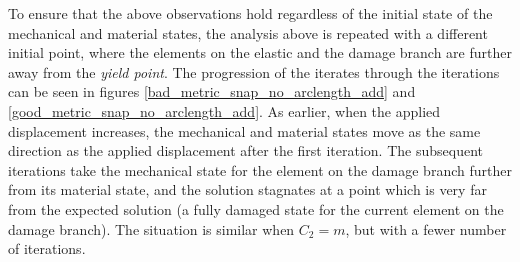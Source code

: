 \documentclass[10pt]{elsarticle}
\begin{document}
To ensure that the above observations hold regardless of the initial state of the mechanical and material states, the analysis above is repeated with a different initial point, where the elements on the elastic and the damage branch are further away from the \textit{yield point}. The progression of the iterates through the iterations can be seen in figures \ref{bad_metric_snap_no_arclength_add} and \ref{good_metric_snap_no_arclength_add}. As earlier, when the applied displacement increases, the mechanical and material states move as the same direction as the applied displacement after the first iteration. The subsequent iterations take the mechanical state for the element on the damage branch further from its material state, and the solution stagnates at a point which is very far from the expected solution (a fully damaged state for the current element on the damage branch). The situation is similar when $C_2=m$, but with a fewer number of iterations.
\end{document}
